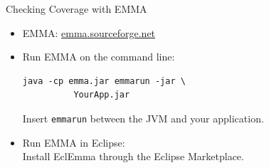 \begin{frame}[fragile]{Checking Coverage with EMMA}
  \begin{itemize}
    \item EMMA: \href{http://emma.sourceforge.net/}{emma.sourceforge.net}
    \item Run EMMA on the command line:
      \begin{lstlisting}[language={},gobble=8]
        java -cp emma.jar emmarun -jar \
          YourApp.jar
      \end{lstlisting}
      Insert \texttt{emmarun} between the JVM and your application.
    \item Run EMMA in Eclipse:\\
      Install EclEmma through the Eclipse Marketplace.
  \end{itemize}
\end{frame}

